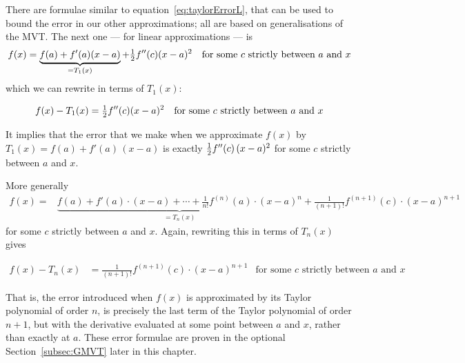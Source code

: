 \begin{eg}
\end{eg}

There are formulae similar to equation~\eqref{eq:taylorErrorL}, that can be used to bound
the error in our other approximations; all are based on generalisations of the
MVT. The
next one --- for linear approximations --- is
\begin{align*}
f(x) & =\underbrace{f(a)+f'(a)(x-a)}_{=T_1(x)}+\tfrac{1}{2} f''(c)(x-a)^2 &
\text{for some $c$ strictly between $a$ and $x$}
\end{align*}
which we can rewrite in terms of $T_1(x)$:
\begin{impeqn}\label{eq:taylorErrorQ}
\begin{align*}
f(x)-T_1(x) &=  \tfrac{1}{2} f''(c)(x-a)^2 & \text{for some $c$ strictly between $a$ and $x$}
\end{align*}
\end{impeqn}
It implies that the error that we make when we approximate $f(x)$ by
$T_1(x) = f(a)+f'(a)\,(x-a)$ is exactly $\tfrac{1}{2} f''(c)\,(x-a)^2$ for some $c$ strictly
between $a$ and $x$.


More generally
\begin{align*}
f(x)=&
\underbrace{f(a)+f'(a)\cdot(x-a)+\cdots+\frac{1}{n!}f^{(n)}(a)\cdot(x-a)^n}_{= T_n(x)}
+\frac{1}{(n+1)!}f^{(n+1)}(c)\cdot (x-a)^{n+1}
\end{align*}
for some $c$ strictly between $a$ and $x$. Again, rewriting this in terms of $T_n(x)$
gives
\begin{impeqn}\label{eq:taylorErrorN}
\begin{align*}
  f(x) - T_n(x) &= \frac{1}{(n+1)!}f^{(n+1)}(c)\cdot (x-a)^{n+1}
& \text{for some $c$ strictly between $a$ and $x$}
\end{align*}
\end{impeqn}

That is, the error introduced when $f(x)$ is approximated by its Taylor
polynomial of order $n$, is precisely the last term of the Taylor polynomial
of order $n+1$, but with the derivative evaluated at some point between
$a$ and $x$, rather than exactly at $a$. These error formulae are proven
in the optional Section~\ref{subsec:GMVT} later in this chapter.


